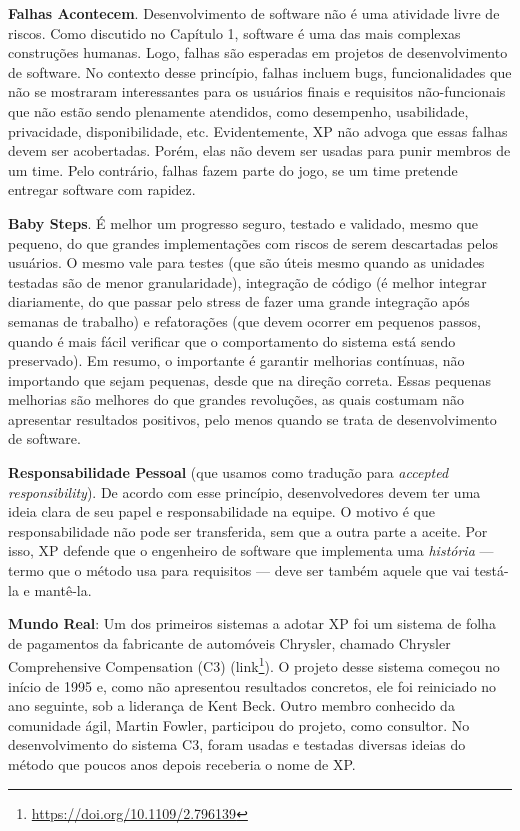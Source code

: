 \documentclass[
  11pt,
  twoside]{book}
\DeclareRobustCommand{\href}[2]{#2\footnote{\url{#1}}}
\newenvironment{esmbox}{\centering \vspace{1.5ex} \begin{tcolorbox}[breakable, colback=backcolor, width=4.9in]}{\end{tcolorbox} \vspace{1.5ex}}
\begin{document}
\textbf{Falhas Acontecem}. Desenvolvimento de software não é uma
atividade livre de riscos. Como discutido no Capítulo 1, software é uma
das mais complexas construções humanas. Logo, falhas são esperadas em
projetos de desenvolvimento de software. No contexto desse princípio,
falhas incluem bugs, funcionalidades que não se mostraram interessantes
para os usuários finais e requisitos não-funcionais que não estão sendo
plenamente atendidos, como desempenho, usabilidade, privacidade,
disponibilidade, etc. Evidentemente, XP não advoga que essas falhas
devem ser acobertadas. Porém, elas não devem ser usadas para punir
membros de um time. Pelo contrário, falhas fazem parte do jogo, se um
time pretende entregar software com rapidez.

 \textbf{Baby Steps}. É melhor um progresso seguro,
testado e validado, mesmo que pequeno, do que grandes implementações com
riscos de serem descartadas pelos usuários. O mesmo vale para testes
(que são úteis mesmo quando as unidades testadas são de menor
granularidade), integração de código (é melhor integrar diariamente, do
que passar pelo stress de fazer uma grande integração após semanas de
trabalho) e refatorações (que devem ocorrer em pequenos passos, quando é
mais fácil verificar que o comportamento do sistema está sendo
preservado). Em resumo, o importante é garantir melhorias contínuas, não
importando que sejam pequenas, desde que na direção correta. Essas
pequenas melhorias são melhores do que grandes revoluções, as quais
costumam não apresentar resultados positivos, pelo menos quando se trata
de desenvolvimento de software.

\textbf{Responsabilidade Pessoal} (que usamos como tradução para
\emph{accepted responsibility}). De acordo com esse princípio,
desenvolvedores devem ter uma ideia clara de seu papel e
responsabilidade na equipe. O motivo é que responsabilidade não pode ser
transferida, sem que a outra parte a aceite. Por isso, XP defende que o
engenheiro de software que implementa uma \emph{história} --- termo que
o método usa para requisitos --- deve ser também aquele que vai testá-la
e mantê-la.


\begin{esmbox}

\textbf{Mundo Real}: Um dos primeiros sistemas a adotar XP foi um
sistema de folha de pagamentos da fabricante de automóveis Chrysler,
chamado Chrysler Comprehensive Compensation (C3)
(\href{https://doi.org/10.1109/2.796139}{link}). O projeto desse sistema
começou no início de 1995 e, como não apresentou resultados concretos,
ele foi reiniciado no ano seguinte, sob a liderança de Kent Beck. Outro
membro conhecido da comunidade ágil, Martin Fowler, participou do
projeto, como consultor. No desenvolvimento do sistema C3, foram usadas
e testadas diversas ideias do método que poucos anos depois receberia o
nome de XP.

\end{esmbox}
\end{document}
